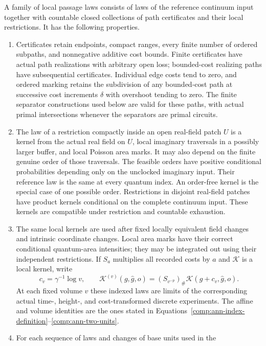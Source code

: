 \begin{definition}
\label{common:admissible}
A family of local passage laws consists of laws of the reference
continuum input together with countable closed collections of path
certificates and their local restrictions.  It has the following
properties.
\begin{enumerate}[label=(\roman*)]
\item Certificates retain endpoints, compact ranges, every finite
number of ordered subpaths, and nonnegative additive cost bounds.
Finite certificates have actual path realizations with arbitrary open
loss; bounded-cost realizing paths have subsequential certificates.
Individual edge costs tend to zero, and ordered marking retains the
subdivision of any bounded-cost path at successive cost increments
$\delta$ with overshoot tending to zero.  The finite separator constructions
used below are valid for these paths, with actual primal intersections
whenever the separators are primal circuits.
\item The law of a restriction compactly inside an open real-field
patch $U$ is a kernel from the actual real field on $U$, local imaginary
traversals in a possibly larger buffer, and local Poisson area marks.
It may also depend on the finite genuine order of those traversals.
The feasible orders have positive conditional probabilities depending
only on the unclocked imaginary input.  Their reference law is the same
at every quantum index.  An order-free kernel is the special case of
one possible order.  Restrictions in disjoint real-field patches have
product kernels conditional on the complete continuum input.  These
kernels are compatible under restriction and countable exhaustion.
\item The same local kernels are used after fixed locally equivalent
field changes and intrinsic coordinate changes.  Local area marks have
their correct conditional quantum-area intensities; they may be
integrated out using their independent restrictions.  If $S_a$ multiplies
all recorded costs by $a$ and $\mathcal K$ is a local kernel, write
\[
 c_v=\gamma^{-1}\log v,\qquad
 \mathcal K^{(v)}(g,\widehat g,o)
  =(S_{v^{-p}})_\#\mathcal K(g+c_v,\widehat g,o).
\]
At each fixed volume $v$ these indexed laws are limits of the corresponding actual
time-, height-, and cost-transformed discrete experiments.  The affine
and volume identities are the ones stated in
Equations~\eqref{comp:ann-index-definition}--\eqref{comp:ann-two-units}.
\item For each sequence of laws and changes of base units used in the

\end{enumerate}
\end{definition}
